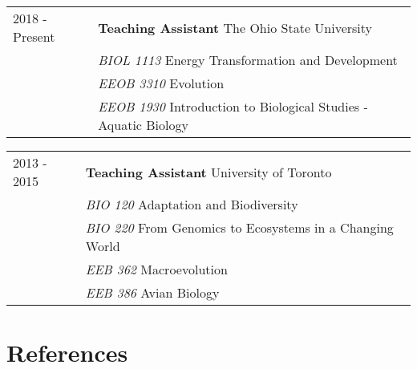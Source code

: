 \documentclass[11pt]{article}
\begin{document}
\begin{longtable}{p{}  p{}}

2018 - Present & \textbf{Teaching Assistant} The Ohio State University\\
 & \textit{BIOL 1113} Energy Transformation and Development\\
& \textit{EEOB 3310} Evolution\\
& \textit{EEOB 1930} Introduction to Biological Studies - Aquatic Biology\\

\end{longtable}



\begin{longtable}{p{}  p{}}

2013 - 2015 & \textbf{Teaching Assistant} University of Toronto\\
 & \textit{BIO 120} Adaptation and Biodiversity\\
 & \textit{BIO 220} From Genomics to Ecosystems in a Changing World\\
& \textit{EEB 362} Macroevolution\\
& \textit{EEB 386} Avian Biology\\

\end{longtable}




\newpage

\section*{References}
\end{document}

